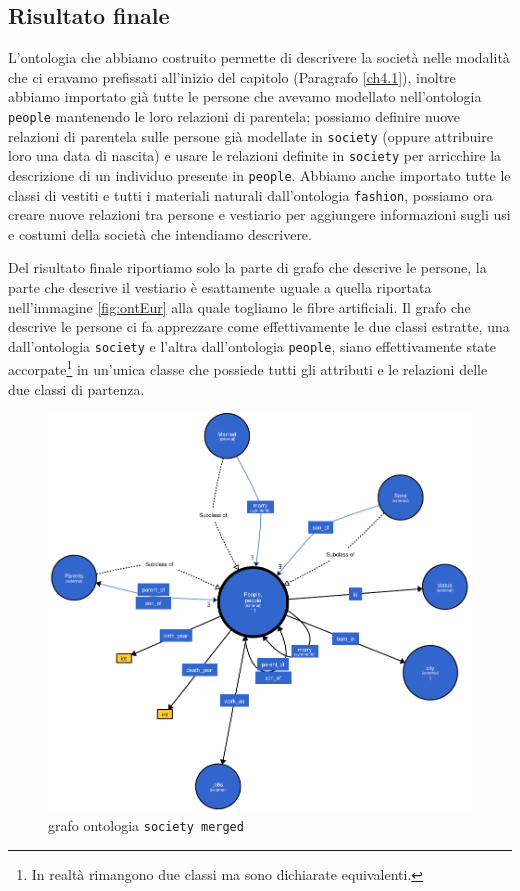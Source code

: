 \subsection{Risultato finale}
L'ontologia che abbiamo costruito permette di descrivere la società nelle modalità che ci eravamo prefissati all'inizio del capitolo (Paragrafo \ref{ch4.1}), inoltre abbiamo importato già tutte le persone che avevamo modellato nell'ontologia \verb|people| mantenendo le loro relazioni di parentela; possiamo definire nuove relazioni di parentela sulle persone già modellate in \verb|society| (oppure attribuire loro una data di nascita) e usare le relazioni definite in \verb|society| per arricchire la descrizione di un individuo presente in \verb|people|. Abbiamo anche importato tutte le classi di vestiti e tutti i materiali naturali dall'ontologia \verb|fashion|, possiamo ora creare nuove relazioni tra persone e vestiario  per aggiungere informazioni sugli usi e costumi della società che intendiamo descrivere.

Del risultato finale riportiamo solo la parte di grafo che descrive le persone, la parte che descrive il vestiario è esattamente uguale a quella riportata nell'immagine \ref{fig:ontEur} alla quale togliamo le fibre artificiali. Il grafo che descrive le persone ci fa apprezzare come effettivamente le due classi estratte, una dall'ontologia \verb|society| e l'altra dall'ontologia \verb|people|, siano effettivamente state accorpate\footnote{In realtà rimangono due classi ma sono dichiarate equivalenti.} in un'unica classe che possiede tutti gli attributi e le relazioni delle due classi di partenza.
\begin{figure}[H]
	\centering
	\includegraphics[width=\textwidth]{Picture/society_merged.rdf.pdf}
	\caption{grafo ontologia \texttt{society merged}}
\end{figure}

